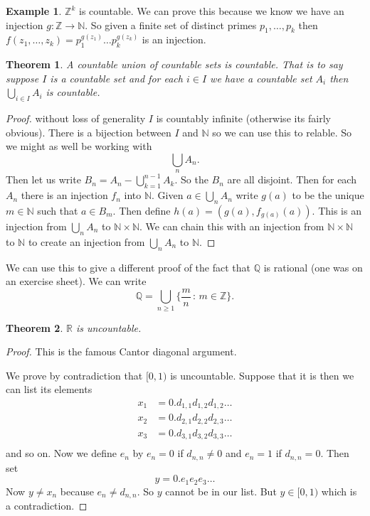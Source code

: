 \documentclass[
]{book}
\newtheorem{theorem}{Theorem}[chapter]
\theoremstyle{definition}
\theoremstyle{definition}
\newtheorem{example}{Example}[chapter]
\theoremstyle{definition}
\theoremstyle{definition}
\theoremstyle{remark}
\begin{document}
\begin{example}
\(\mathbb{Z}^k\) is countable. We can prove this because we know we have an injection \(g: \mathbb{Z} \rightarrow \mathbb{N}\). So given a finite set of distinct primes \(p_1, \dots, p_k\) then \(f(z_1, \dots, z_k) = p_1^{g(z_1)} \dots p_k^{g(z_k)}\) is an injection.
\end{example}

\begin{theorem}
A countable union of countable sets is countable. That is to say suppose \(I\) is a countable set and for each \(i \in I\) we have a countable set \(A_i\) then \(\bigcup_{i \in I} A_i\) is countable.
\end{theorem}

\begin{proof}
without loss of generality \(I\) is countably infinite (otherwise its fairly obvious). There is a bijection between \(I\) and \(\mathbb{N}\) so we can use this to relable. So we might as well be working with
\[ \bigcup_n A_n.  \]
Then let us write \(B_n = A_n - \bigcup_{k=1}^{n-1}A_k\). So the \(B_n\) are all disjoint. Then for each \(A_n\) there is an injection \(f_n\) into \(\mathbb{N}\). Given \(a \in \bigcup_n A_n\) write \(g(a)\) to be the unique \(m \in \mathbb{N}\) such that \(a \in B_m\). Then define \(h(a) = (g(a), f_{g(a)}(a))\). This is an injection from \(\bigcup_n A_n\) to \(\mathbb{N} \times \mathbb{N}\). We can chain this with an injection from \(\mathbb{N} \times \mathbb{N}\) to \(\mathbb{N}\) to create an injection from \(\bigcup_n A_n\) to \(\mathbb{N}\).
\end{proof}

We can use this to give a different proof of the fact that \(\mathbb{Q}\) is rational (one was on an exercise sheet). We can write
\[ \mathbb{Q} = \bigcup_{n \geq 1} \{ \frac{m}{n} \, :\, m \in \mathbb{Z}\}.\]

\begin{theorem}
\(\mathbb{R}\) is uncountable.
\end{theorem}

\begin{proof}
This is the famous Cantor diagonal argument.

We prove by contradiction that \([0,1)\) is uncountable. Suppose that it is then we can list its elements
\begin{align*}
x_1 &= 0. d_{1,1} d_{1,2} d_{1,2} \dots \\
x_2 &= 0. d_{2,1} d_{2,2} d_{2,3} \dots \\
x_3 &= 0. d_{3,1} d_{3,2} d_{3,3} \dots \\
\end{align*}
and so on. Now we define \(e_n\) by \(e_n = 0\) if \(d_{n,n} \neq 0\) and \(e_n = 1\) if \(d_{n, n} =0\). Then set
\[ y = 0. e_1 e_2 e_3 \dots \]
Now \(y \neq x_n\) because \(e_n \neq d_{n,n}\). So \(y\) cannot be in our list. But \(y \in [0,1)\) which is a contradiction.
\end{proof}
\end{document}
